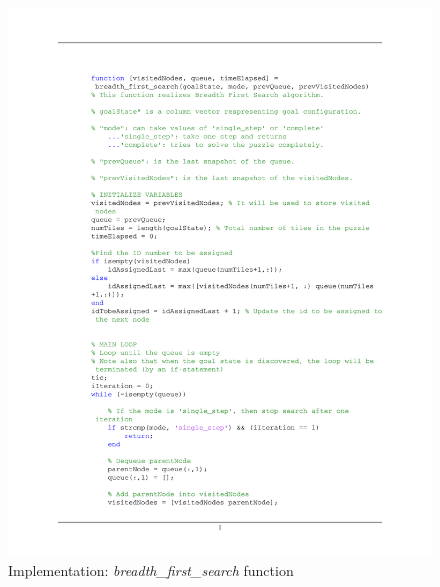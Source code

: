 \documentclass[12pt]{article}
\begin{document}
\begin{figure}[htb]
	\centering
	\includegraphics[width=1\columnwidth]{images/Code_breadth_first_search.pdf}
	\caption{Implementation: \textit{breadth\_first\_search} function}
	\label{}
\end{figure}
\end{document}
